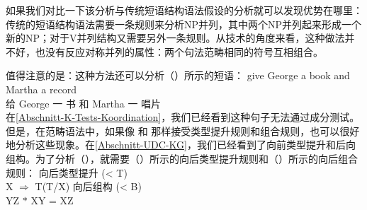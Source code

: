 \begin{exe}
\begin{xlist}[iv.]
\begin{exe}
\begin{xlist}[iv.]
如果我们对比一下该分析与传统短语结构语法假设的分析就可以发现优势在哪里：传统的短语结构语法需要一条规则来分析NP并列，其中两个NP并列起来形成一个新的NP；对于V并列结构又需要另外一条规则。从技术的角度来看，这种做法并不好，也没有反应对称并列的属性：两个句法范畴相同的符号互相组合。 

值得注意的是：这种方法还可以分析（）所示的短语：
\ea
\label{Beispiel-Gapping-Steedman}
\gll give George a book and Martha a record\\
     给 George 一 书 和 Martha 一 唱片\\
\z
在\ref{Abschnitt-K-Tests-Koordination}，我们已经看到这种句子无法通过成分测试。但是，在范畴语法中，如果像 \citet{Dowty88a-u}和 \citet{Steedman91a}那样接受类型提升规则和组合规则，也可以很好地分析这些现象。在\ref{Abschnitt-UDC-KG}，我们已经看到了向前类型提升和后向组构。为了分析（），就需要（）所示的向后类型提升规则和（）所示的向后组合规则：
\ea
向后类型提升 (< T)\\
X $\Rightarrow$ T\bs (T/X)
\z
\ea
向后组构 (< B)\\
    Y\bs Z $*$ X\bs Y = X\bs Z
\z


\end{xlist}
\end{exe}
\end{xlist}
\end{exe}
